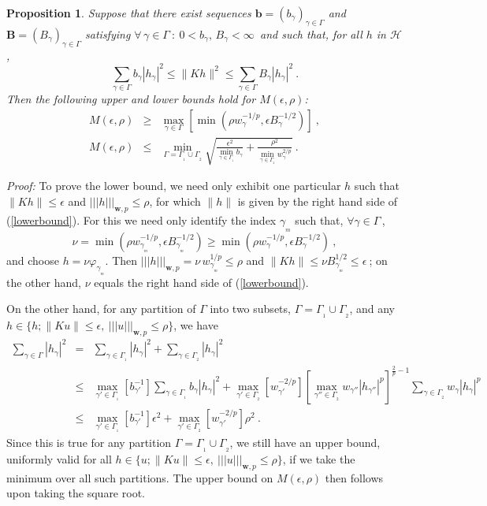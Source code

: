 \documentclass[10pt]{article}
\newtheorem{proposition}[theorem]{Proposition}
\newcommand{\QED}{\hfill \raisebox{-2pt}{\rule{5.6pt}{8pt}\rule{4pt}{0pt}}%
  \smallskip\par}
\def\cH{\mathcal{H}}
\def\ag{w_{\gamma}}
\def\g{\gamma}
\newcommand\eref[1]{(\ref{#1})}
\def\Vvert{\vert\!\vert\!\vert}
\begin{document}
\begin{proposition}
\label{convrate-gen}
Suppose that there exist sequences $\mathbf{b}=(b_\g)_{\g \in \Gamma}$
and $\mathbf{B}=(B_\g)_{\g \in \Gamma}$ satisfying
$\forall \,\g \in \Gamma ~:~ 0 < b_\g,
\, B_\g < \infty\,$ and such that, for all $h$ in $\cH$,
\begin{equation}
\label{extraK}
\sum_{\g \in \Gamma} b_\g |h_\g|^2 \leq \|K h \|^2
\leq \sum_{\g \in \Gamma} B_\g |h_\g|^2 ~.
\end{equation}
Then the following upper and lower bounds hold for $M(\epsilon,\rho)$:
\begin{eqnarray}
\label{lowerbound}
M(\epsilon,\rho) &\geq & \max_{\g \in \Gamma}
\left[ \min \left(\rho \ag^{-1/p},\epsilon B_\g^{-1/2} \right) \right]~, \\
\label{upperbound}
M(\epsilon,\rho) &\leq & \min_{\Gamma = \Gamma_{_{\!1}} \cup \Gamma_{_{\!2}}}
\sqrt{ \frac{\epsilon^2}{\min_{\g \in \Gamma_{_{\!1}}}b_\g} +
\frac{\rho^2}{\min_{\g \in \Gamma_{_{\!2}}}\ag^{2/p}} } ~.
\end{eqnarray}
\end{proposition}
{\em Proof:}
To prove the lower bound, we need only exhibit one particular $h$ such that
$\|Kh\| \le \epsilon$ and $\Vvert h \Vvert_{\mathbf{w},p}\le \rho$, for which
$\|h\|$ is given by the right hand side of
\eref{lowerbound}. For this we need only identify the index ${\g_{_m}}$ such
that, $\forall \g \in \Gamma \,$,
$$
\nu = \min \left(\rho w_{\g_{_m}}^{-1/p},\epsilon B_{\g_{_m}}^{-1/2} \right)
\ge  \min \left(\rho \ag^{-1/p},\epsilon B_\g^{-1/2} \right) ~,
$$
and choose $h = \nu \varphi_{\g_{_m}}$. Then $\Vvert h
\Vvert_{\mathbf{w},p} =
\nu \, w_{\g_{_m}}^{1/p} \le \rho$ and $\|K h \| \le  \nu B_{\g_{_m}}^{1/2}
\le \epsilon ~$; on the other hand, $\nu$ equals the right hand side of
\eref{lowerbound}.

On the other hand, for any partition of $\Gamma$ into two subsets,
$\Gamma = \Gamma_{_{\!1}} \cup \Gamma_{_{\!2}}$,
and any $h \in \{h; \|Ku\|\le \epsilon, ~\Vvert u \Vvert_{\mathbf{w},p} \le
\rho \}$, we have
\begin{eqnarray*}
\sum_{\g \in \Gamma}|h_\g|^2 &=& \sum_{\g \in \Gamma_{_{\!1}}} |h_\g|^2 +
\sum_{\g \in \Gamma_{_{\!2}}} |h_\g|^2 \\
&\le & \max_{\g' \in \Gamma_{_{\!1}}} [b_{\g'}^{-1} ]
\sum_{\g \in \Gamma_{_{\!1}}} b_\g |h_\g|^2 +
\max_{\g' \in \Gamma_{_{\!2}}}[ w_{\g'}^{-2/p}][\max_{\g'' \in
\Gamma_{_{\!2}}} w_{\g''}
|h_{\g''}|^p]^{\frac{2}{p}-1 } \sum_{\g \in \Gamma_{_{\!2}}} \ag |h_\g|^p \\
& \le & \max_{\g' \in \Gamma_{_{\!1}}} [b_{\g'}^{-1}] \epsilon^2
+ \max_{\g' \in \Gamma_{_{\!2}}}[ w_{\g'}^{-2/p}] \rho^2 ~.
\end{eqnarray*}
Since this is true for any partition $\Gamma = \Gamma_{_{\!1}} \cup
\Gamma_{_{\!2}}$, we
still have an upper bound, uniformly valid for all $h \in
\{u; \|Ku\|\le \epsilon, ~\Vvert u \Vvert_{\mathbf{w},p} \le \rho \}$, if we
take the minimum over all such partitions. The upper bound on
$M(\epsilon,\rho)$ then follows upon taking the square root.
\hfill \QED
\end{document}
